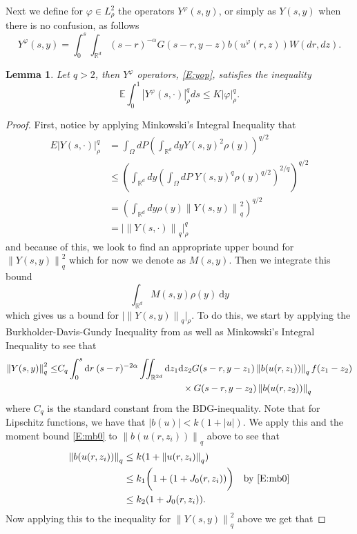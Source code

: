 \documentclass[a4paper,11pt]{article}%
\numberwithin{equation}{section}
\theoremstyle{plain}
\newtheorem{lemma}[theorem]{Lemma}
\theoremstyle{definition}
\newcommand{\R}{\mathbb{R}}
\newcommand{\E}{\mathbb{E}}
\newcommand{\Norm}[1]{\left\|  #1   \right\|}
\newcommand{\ud}{\ensuremath{ \mathrm{d} }}
\begin{document}
Next we define for $\varphi \in L^2_{\rho}$ the operators $Y^\varphi(s,y)$, or simply as $Y(s,y)$ when there is no
confusion, as follows
\begin{equation}
	\label{E:yop}
	Y^\varphi(s,y) =\int_0^s \int_{\R^d} (s-r)^{-\alpha}G(s-r,y-z)b(u^\varphi(r,z))W(dr,dz).
\end{equation}

\begin{lemma}
	\label{L:yineq}
	Let $q>2$, then $Y^\varphi$ operators, \eqref{E:yop}, satisfies the inequality
	\begin{equation}
		\label{E:yineq}
		\E\int_0^1 |Y^\varphi(s,\cdot)|_{\rho}^q ds \le K|\varphi|_\rho^q .
	\end{equation}
\end{lemma}

\begin{proof} First, notice by applying Minkowski's Integral Inequality that
\begin{align*}
E |Y(s,\cdot)|_{\rho}^q &= \int_\Omega dP \left(\int_{\R^d} dy Y(s,y)^2\rho(y) \right)^{q/2}
\\ &\le \left(\int_{\R^d}dy \left( \int_\Omega dP \; Y(s,y)^q \rho(y)^{q/2} \right)^{2/q}\right)^{q/2}
\\ &= \left(\int_{\R^d}dy \rho(y) \Norm{ Y(s,y) }_q^2 \right)^{q/2}
\\ &= \big| \Norm{ Y(s,\cdot) }_q \big|_\rho^q
\end{align*}
and because of this, we look to find an appropriate upper bound for $\Norm{Y(s,y)}^2_q$ which for now we denote as
$M(s,y)$. Then we integrate this bound $$ \int_{\R^d}M(s,y)\rho(y)\:\ud y$$ which gives us a bound for $\big|
\Norm{Y(s,y)}_q\big|_\rho$. To do this, we start by applying the Burkholder-Davis-Gundy Inequality from
\cite{DalangEtc09Minicourse} as well as Minkowski's Integral Inequality to see that
\begin{align*}
	\Norm{Y(s,y)}_q^2 \le & C_q \int_0^s \ud r \: (s-r)^{-2\alpha} \iint_{\R^{2d}} \ud z_1\ud z_2 G(s-r,y-z_1)
	\Norm{b(u(r,z_1))}_q f(z_1-z_2)\\
	&\hspace{13.5em} \times  G(s-r,y-z_2) \Norm{b(u(r,z_2))}_q
\end{align*}
where $C_q$ is the standard constant from the BDG-inequality. Note that for Lipschitz functions, we have that
$|b(u)|<k(1+|u|)$. We apply this and the moment bound \eqref{E:mb0} to $\Norm{b(u(r,z_i))}_q$ above to see that
\begin{align*}
	\Norm{b(u(r,z_i))}_q
	   & \le k(1+\Norm{u(r,z_i)}_q)
	\\ & \le k_1\bigg(1+(1+J_0(r,z_i))\bigg) \quad \text{by \eqref{E:mb0}}
	\\ & \le k_2(1+J_0(r,z_i)).
\end{align*}
Now applying this to the inequality for $\Norm{Y(s,y)}_q^2$ above we get that


\end{proof}
\end{document}
